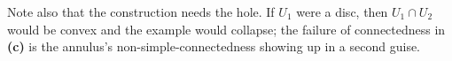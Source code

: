 \begin{exercisesolution}
\begin{remark}
Note also that the construction needs the hole. If $U_1$ were a disc, then $U_1 \cap U_2$ would
be convex and the example would collapse; the failure of connectedness in \textbf{(c)} is the
annulus's non-simple-connectedness showing up in a second guise.
\end{remark}
\end{exercisesolution}
